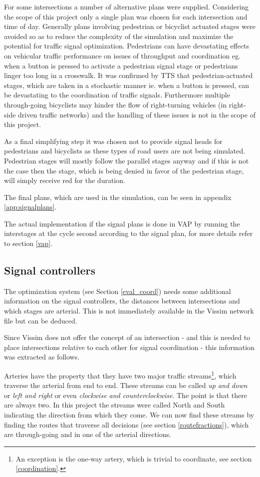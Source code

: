 For some intersections a number of alternative plans were supplied. Considering the scope of this project only a single plan was chosen for each intersection and time of day. Generally plans involving pedestrian or bicyclist actuated stages were avoided so as to reduce the complexity of the simulation and maximize the potential for traffic signal optimization. Pedestrians can have devastating effects on vehicular traffic performance on issues of throughput and coordination eg. when a button is pressed to activate a pedestrian signal stage or pedestrians linger too long in a crosswalk. It was confirmed by TTS that pedestrian-actuated stages, which are taken in a stochastic manner ie. when a button is pressed, can be devastating to the coordination of traffic signals. Furthermore multiple through-going bicyclists may hinder the flow of right-turning vehicles (in right-side driven traffic networks) and the handling of these issues is not in the scope of this project.

As a final simplifying step it was chosen not to provide signal heads for pedestrians and bicyclists as these types of road users are not being simulated. Pedestrian stages will mostly follow the parallel stages anyway and if this is not the case then the stage, which is being denied in favor of the pedestrian stage, will simply receive red for the duration.

The final plans, which are used in the simulation, can be seen in appendix \ref{app:signalplans}.

The actual implementation if the signal plans is done in VAP by running the interstages at the cycle second according to the signal plan, for more details refer to section \ref{vap}.

\subsection{Signal controllers}
\label{signal_details}
The optimization system (see Section \ref{eval_coord}) needs some additional information on the signal controllers, the distances between intersections and which stages are arterial. This is not immediately available in the Vissim network file but can be deduced.

Since Vissim does not offer the concept of an intersection - and this is needed to place intersections relative to each other for signal coordination - this information was extracted as follows.

Arteries have the property that they have two major traffic streams\footnote{An exception is the one-way artery, which is trivial to coordinate, see section \ref{coordination}.}, which traverse the arterial from end to end. These streams can be called \textit{up and down} or \textit{left and right} or even \textit{clockwise and counterclockwise}. The point is that there are always two. In this project the streams were called North and South indicating the direction from which they come. We can now find these streams by finding the routes that traverse all decisions (see section \ref{routefractions}), which are through-going and in one of the arterial directions.

